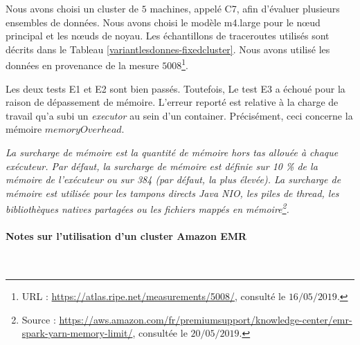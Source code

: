 Nous avons choisi un cluster de $ 5 $ machines, appelé C7, afin d'évaluer plusieurs ensembles de données. Nous avons choisi le modèle m4.large pour le n\oe{}ud principal et les n\oe{}uds de noyau. Les échantillons de traceroutes utilisés sont décrits dans le Tableau \ref{variantlesdonnes-fixedcluster}. Nous avons utilisé les données en provenance de la mesure $ 5008 $\footnote{URL : \url{https://atlas.ripe.net/measurements/5008/}, consulté le $16/05/2019$.}.


\begin{table}[H]
	\centering
\caption{Les traceroutes utilisés dans le cluster C7}
\label{variantlesdonnes-fixedcluster}
\end{table}

Les deux tests E1 et E2 sont bien passés. Toutefois, Le test E3 a échoué pour la raison de dépassement de mémoire. L'erreur reporté est relative à la charge de travail qu'a subi un \textit{executor} au sein d'un container. Précisément, ceci concerne la mémoire $ memoryOverhead $. 

\textit{La surcharge de mémoire est la quantité de mémoire hors tas allouée à chaque exécuteur. Par défaut, la surcharge de mémoire est définie sur 10 \% de la mémoire de l'exécuteur ou sur 384 (par défaut, la plus élevée). La surcharge de mémoire est utilisée pour les tampons directs Java NIO, les piles de thread, les bibliothèques natives partagées ou les fichiers mappés en mémoire\footnote{Source : \url{https://aws.amazon.com/fr/premiumsupport/knowledge-center/emr-spark-yarn-memory-limit/}, consultée le $20/05/2019$.}.}

\paragraph{Notes sur l'utilisation d'un cluster Amazon EMR}~

